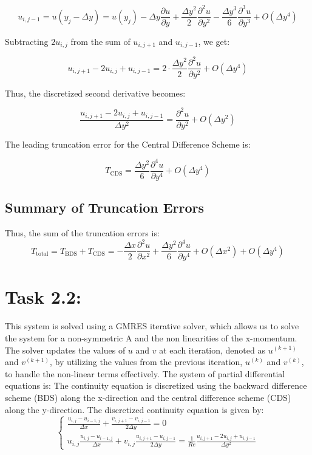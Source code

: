 \documentclass{article}
\begin{document}
\[
u_{i,j-1} = u(y_j - \Delta y) = u(y_j) - \Delta y \frac{\partial u}{\partial y} + \frac{\Delta y^2}{2} \frac{\partial^2 u}{\partial y^2} - \frac{\Delta y^3}{6} \frac{\partial^3 u}{\partial y^3} + O(\Delta y^4)
\]

Subtracting \( 2u_{i,j} \) from the sum of \( u_{i,j+1} \) and \( u_{i,j-1} \), we get:

\[
u_{i,j+1} - 2u_{i,j} + u_{i,j-1} = 2 \cdot \frac{\Delta y^2}{2} \frac{\partial^2 u}{\partial y^2} + O(\Delta y^4)
\]

Thus, the discretized second derivative becomes:

\[
\frac{u_{i,j+1} - 2u_{i,j} + u_{i,j-1}}{\Delta y^2} = \frac{\partial^2 u}{\partial y^2} + O(\Delta y^2)
\]

The leading truncation error for the Central Difference Scheme is:

\[
T_{\text{CDS}} = \frac{\Delta y^2}{6} \frac{\partial^4 u}{\partial y^4} + O(\Delta y^4)
\]
\subsection*{Summary of Truncation Errors}

Thus, the sum of the truncation errors is:
\[
T_{\text{total}} = T_{\text{BDS}} + T_{\text{CDS}} = -\frac{\Delta x}{2} \frac{\partial^2 u}{\partial x^2} + \frac{\Delta y^2}{6} \frac{\partial^4 u}{\partial y^4} + O(\Delta x^2) + O(\Delta y^4)
\]

\section*{\Large Task 2.2:}
This system is solved using a GMRES iterative solver, which allows us to solve the system for a non-symmetric A and the non linearities of the x-momentum.
The solver updates the values of \( u \) and \( v \) at each iteration, denoted as \( u^{(k+1)} \) and \( v^{(k+1)} \), by utilizing the values from the previous iteration, \( u^{(k)} \) and \( v^{(k)} \), to handle the non-linear terms effectively.
The system of partial differential equations is:
The continuity equation is discretized using the backward difference scheme (BDS) along the x-direction and the central difference scheme (CDS) along the y-direction. The discretized continuity equation is given by:
\[
\begin{cases}
  \frac{u_{i,j} - u_{i-1,j}}{\Delta x} + \frac{v_{i,j+1} - v_{i,j-1}}{2 \Delta y} = 0 \\
  u_{i,j}\frac{u_{i,j} - u_{i-1,j}}{\Delta x}  + v_{i,j} \frac{u_{i,j+1} - u_{i,j-1}}{2 \Delta y} = \frac{1}{Re} \frac{u_{i,j+1} - 2u_{i,j} + u_{i,j-1}}{\Delta y^2}
\end{cases}
\]
\end{document}
